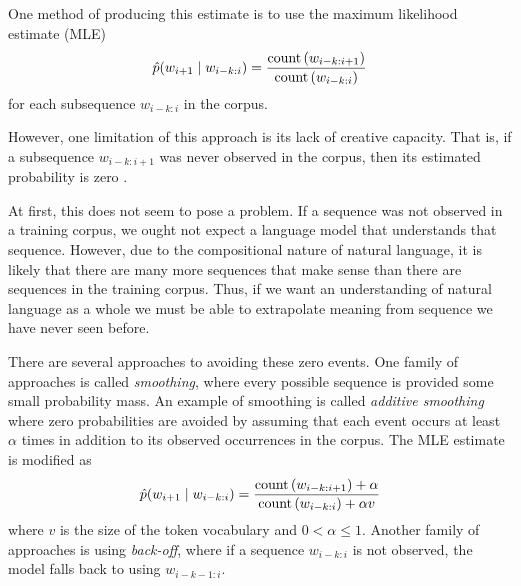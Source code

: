 One method of producing this estimate is to use the maximum likelihood estimate (MLE)
\begin{equation}
    \hat p (w_{i+1} \mid w_{i-k:i}) = \frac{\operatorname{count}\left(w_{i-k:i+1}\right)}{\operatorname{count}\left(w_{i-k:i}\right)} \label{eq:language-models:mle}
\end{equation}
for each subsequence $w_{i-k:i}$ in the corpus.

However, one limitation of this approach is its lack of creative capacity.
That is, if a subsequence $w_{i-k:i+1}$ was never observed in the corpus, then its estimated probability is zero \cite{goldberg_2017}.

At first, this does not seem to pose a problem.
If a sequence was not observed in a training corpus, we ought not expect a language model that understands that sequence.
However, due to the compositional nature of natural language, it is likely that there are many more sequences that make sense than there are sequences in the training corpus.
Thus, if we want an understanding of natural language as a whole we must be able to extrapolate meaning from sequence we have never seen before.

There are several approaches to avoiding these zero events.
One family of approaches is called \textit{smoothing}, where every possible sequence is provided some small probability mass.
An example of smoothing is called \textit{additive smoothing} \cite{chen_goodman_1999,goodman_2001} where zero probabilities are avoided by assuming that each event occurs at least $\alpha$ times in addition to its observed occurrences in the corpus.
The MLE estimate is modified as
\begin{equation}
    \hat p (w_{i+1} \mid w_{i-k:i}) = \frac{\operatorname{count}\left(w_{i-k:i+1}\right) + \alpha}{\operatorname{count}\left(w_{i-k:i}\right) + \alpha v} \label{eq:language-models:alpha-smoothing}
\end{equation}
where $v$ is the size of the token vocabulary and $0 < \alpha \leq 1$. Another family of approaches is using \textit{back-off}, where if a sequence $w_{i-k:i}$ is not observed, the model falls back to using $w_{i-k-1:i}$\cite{chen_goodman_1999,goodman_2001,JelMer80}.

